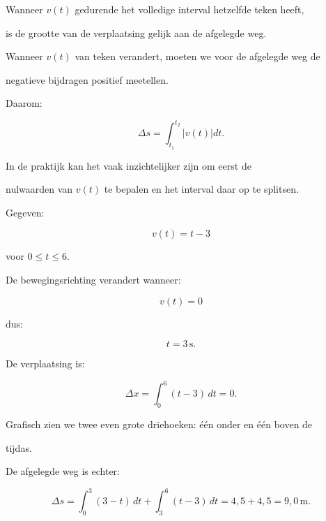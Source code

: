 \documentclass{ximera}
\begin{document}

Wanneer $v(t)$ gedurende het volledige interval hetzelfde teken heeft,

is de grootte van de verplaatsing gelijk aan de afgelegde weg.

Wanneer $v(t)$ van teken verandert, moeten we voor de afgelegde weg de

negatieve bijdragen positief meetellen.

Daarom:

\[\boxed{ \Delta s = \int_{t_1}^{t_2}|v(t)|dt. }\]

In de praktijk kan het vaak inzichtelijker zijn om eerst de

nulwaarden van $v(t)$ te bepalen en het interval daar op te splitsen.

\begin{voorbeeld}

Gegeven:

\[v(t)=t-3\]

voor $0\leq t\leq6$.

De bewegingsrichting verandert wanneer:

\[v(t)=0\]

dus:

\[t=3\,\mathrm{s}.\]

De verplaatsing is:

\[\Delta x = \int_0^6(t-3)\,dt = 0.\]

Grafisch zien we twee even grote driehoeken: één onder en één boven de

tijdas.

De afgelegde weg is echter:

\[\Delta s = \int_0^3(3-t)\,dt + \int_3^6(t-3)\,dt = 4,5+4,5 = 9,0\,\mathrm{m}.\]

\end{voorbeeld}
\end{document}
